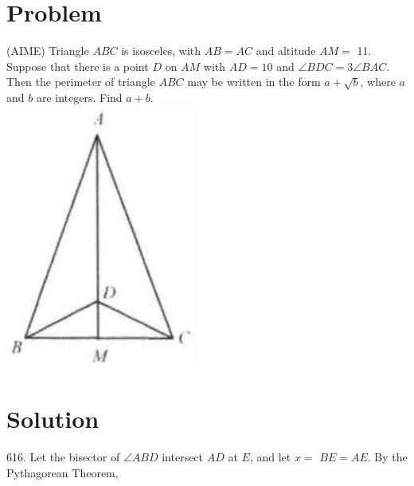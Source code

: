 \documentclass{article}
\begin{document}
\section*{Problem}
(AIME) Triangle \(A B C\) is isosceles, with \(A B=A C\) and altitude \(A M=\) 11. Suppose that there is a point \(D\) on \(A M\) with \(A D=10\) and \(\angle B D C=3 \angle B A C\). Then the perimeter of triangle \(A B C\) may be written in the form \(a+\sqrt{b}\), where \(a\) and \(b\) are integers. Find \(a+b\).\\
\centering
\includegraphics[width=\textwidth]{images/066.jpg}

\section*{Solution}
616.
Let the bisector of \(\angle A B D\) intersect \(A D\) at \(E\), and let \(x=\) \(B E=A E\). By the Pythagorean Theorem,
\end{document}

